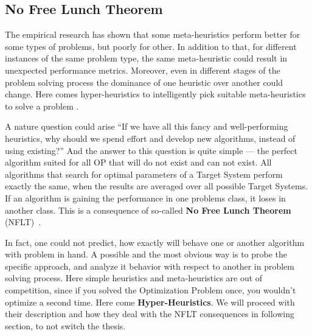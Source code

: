 \subsection{No Free Lunch Theorem}
The empirical research has shown that some meta-heuristics perform better for some types of problems, but poorly for other. In addition to that, for different instances of the same problem type, the same meta-heuristic could result in unexpected performance metrics. Moreover, even in different stages of the problem solving process the dominance of one heuristic over another could change. Here comes hyper-heuristics to intelligently pick suitable meta-heuristics to solve a problem .


A nature question could arise ``If we have all this fancy and well-performing heuristics, why should we spend effort and develop new algorithms, instead of using existing?'' And the answer to this question is quite simple — the perfect algorithm suited for all OP that will do not exist and can not exist. All algorithms that search for optimal parameters of a Target System perform exactly the same, when the results are averaged over all possible Target Systems. If an algorithm is gaining the performance in one problems class, it loses in another class. This is a consequence of so-called \textbf{No Free Lunch Theorem} (NFLT)~\cite{wolpert1997no}.

In fact, one could not predict, how exactly will behave one or another algorithm with problem in hand. A possible and the most obvious way is to probe the specific approach, and analyze it behavior with respect to another in problem solving process. Here simple heuristics and meta-heuristics are out of competition, since if you solved the Optimization Problem once, you wouldn't optimize a second time.
Here come \textbf{Hyper-Heuristics}. We will proceed with their description and how they deal with the NFLT consequences in following section, to not switch the thesis.


